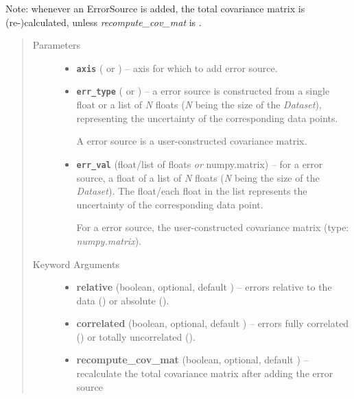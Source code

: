 \documentclass[a4paper,10pt,english]{sphinxmanual}
\begin{document}
\begin{fulllineitems}
\begin{fulllineitems}
Note: whenever an ErrorSource is added, the total covariance matrix
is (re-)calculated, unless \emph{recompute\_cov\_mat} is .
\begin{quote}\begin{description}
\item[{Parameters}] \leavevmode\begin{itemize}
\item {} 
\textbf{\texttt{axis}} ( or ) -- axis for which to add error source.

\item {} 
\textbf{\texttt{err\_type}} ( or ) -- 
a  error source is constructed from a single float or
a list of \emph{N} floats (\emph{N} being the size of the \emph{Dataset}),
representing the uncertainty of the corresponding data points.

A  error source is a user-constructed covariance
matrix.


\item {} 
\textbf{\texttt{err\_val}} (float/list of floats \emph{or} numpy.matrix) -- 
for a  error source, a float of a list of \emph{N} floats
(\emph{N} being the size of the \emph{Dataset}). The float/each float in the
list represents the uncertainty of the corresponding data point.

For a  error source, the user-constructed covariance
matrix (type: \emph{numpy.matrix}).


\end{itemize}

\item[{Keyword Arguments}] \leavevmode\begin{itemize}
\item {} 
\textbf{relative} (boolean, optional, default ) --
errors relative to the data () or absolute ().

\item {} 
\textbf{correlated} (boolean, optional, default ) --
errors fully correlated () or totally uncorrelated
().

\item {} 
\textbf{recompute\_cov\_mat} (boolean, optional, default ) --
recalculate the total covariance matrix after adding the error
source

\end{itemize}


\end{description}
\end{quote}
\end{fulllineitems}
\end{fulllineitems}
\end{document}
